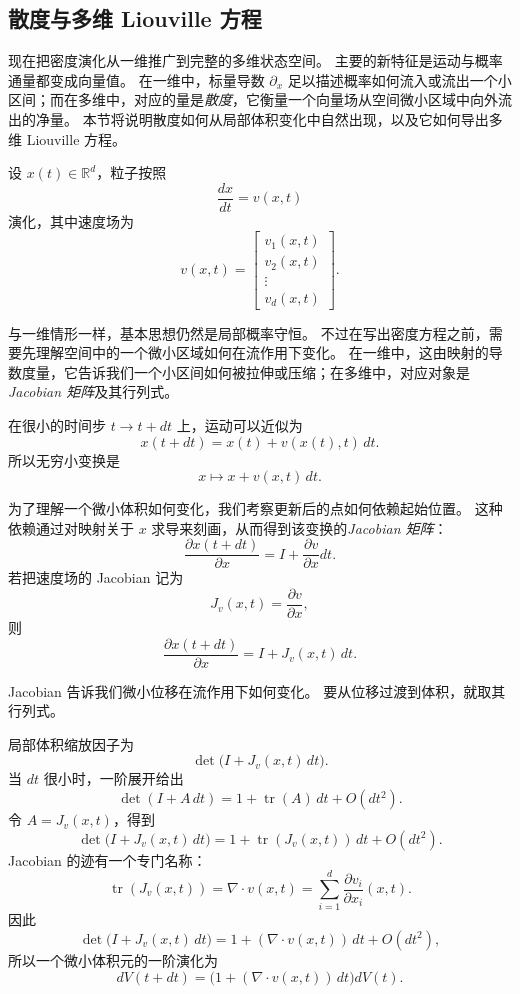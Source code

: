 \subsection{散度与多维 Liouville 方程}

现在把密度演化从一维推广到完整的多维状态空间。
主要的新特征是运动与概率通量都变成向量值。
在一维中，标量导数 $\partial_x$ 足以描述概率如何流入或流出一个小区间；而在多维中，对应的量是\emph{散度}，它衡量一个向量场从空间微小区域中向外流出的净量。
本节将说明散度如何从局部体积变化中自然出现，以及它如何导出多维 Liouville 方程。

设 $x(t)\in\mathbb{R}^d$，粒子按照
\[
\frac{dx}{dt}=v(x,t)
\]
演化，其中速度场为
\[
v(x,t)=
\begin{bmatrix}
v_1(x,t)\\
v_2(x,t)\\
\vdots\\
v_d(x,t)
\end{bmatrix}.
\]

与一维情形一样，基本思想仍然是局部概率守恒。
不过在写出密度方程之前，需要先理解空间中的一个微小区域如何在流作用下变化。
在一维中，这由映射的导数度量，它告诉我们一个小区间如何被拉伸或压缩；在多维中，对应对象是\emph{Jacobian 矩阵}及其行列式。

在很小的时间步 $t\to t+dt$ 上，运动可以近似为
\[
x(t+dt)=x(t)+v(x(t),t)\,dt.
\]
所以无穷小变换是
\[
x\mapsto x+v(x,t)\,dt.
\]

为了理解一个微小体积如何变化，我们考察更新后的点如何依赖起始位置。
这种依赖通过对映射关于 $x$ 求导来刻画，从而得到该变换的\emph{Jacobian 矩阵}：
\[
\frac{\partial x(t+dt)}{\partial x}
=
I+\frac{\partial v}{\partial x}dt.
\]
若把速度场的 Jacobian 记为
\[
J_v(x,t)=\frac{\partial v}{\partial x},
\]
则
\[
\frac{\partial x(t+dt)}{\partial x}=I+J_v(x,t)\,dt.
\]

Jacobian 告诉我们微小位移在流作用下如何变化。
要从位移过渡到体积，就取其行列式。

\begin{tcolorbox}[
  colback=blue!4,
  colframe=blue!50!black,
  title={局部体积缩放与散度},
  boxrule=0.6pt,
  arc=2mm,
  left=2mm,
  right=2mm,
  top=1mm,
  bottom=1mm
]
局部体积缩放因子为
\[
\det\!\bigl(I+J_v(x,t)\,dt\bigr).
\]
当 $dt$ 很小时，一阶展开给出
\[
\det(I+A\,dt)=1+\operatorname{tr}(A)\,dt+O(dt^2).
\]
令 $A=J_v(x,t)$，得到
\[
\det\!\bigl(I+J_v(x,t)\,dt\bigr)
=
1+\operatorname{tr}(J_v(x,t))\,dt+O(dt^2).
\]
Jacobian 的迹有一个专门名称：
\[
\operatorname{tr}(J_v(x,t))
=
\nabla\cdot v(x,t)
=
\sum_{i=1}^d \frac{\partial v_i}{\partial x_i}(x,t).
\]
因此
\[
\det\!\bigl(I+J_v(x,t)\,dt\bigr)
=
1+(\nabla\cdot v(x,t))\,dt+O(dt^2),
\]
所以一个微小体积元的一阶演化为
\[
dV(t+dt)=\bigl(1+(\nabla\cdot v(x,t))\,dt\bigr)dV(t).
\]
\end{tcolorbox}

